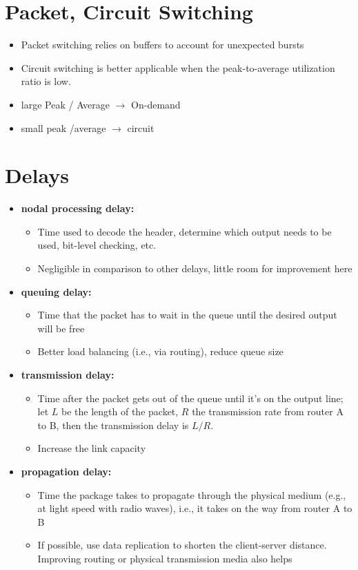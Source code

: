 \documentclass{article}
\begin{document}
\section{Packet, Circuit Switching}

\begin{itemize}
    \item Packet switching relies on buffers to account for unexpected bursts
    \item Circuit switching is better applicable when the peak-to-average utilization ratio is low.
    \item large Peak / Average $\rightarrow$ On-demand
    \item small peak /average $\rightarrow$ circuit
\end{itemize}

\section{Delays}

\begin{itemize}
    \item \textbf{nodal processing delay:}
    \begin{itemize}
        \item Time used to decode the header, determine which output needs to be used, bit-level checking, etc.
        \item Negligible in comparison to other delays, little room for improvement here
    \end{itemize}
    \item \textbf{queuing delay:}
    \begin{itemize}
        \item Time that the packet has to wait in the queue until the desired output will be free
        \item Better load balancing (i.e., via routing), reduce queue size
    \end{itemize}
    \item \textbf{transmission delay:}
    \begin{itemize}
        \item Time after the packet gets out of the queue until it's on the output line; let $L$ be the length of the packet, $R$ the transmission rate from router A to B, then the transmission delay is $L/R$.
        \item Increase the link capacity
    \end{itemize}
    \item \textbf{propagation delay:}
    \begin{itemize}
        \item Time the package takes to propagate through the physical medium (e.g., at light speed with radio waves), i.e., it takes on the way from router A to B
        \item If possible, use data replication to shorten the client-server distance. Improving routing or physical transmission media also helps
    \end{itemize}
\end{itemize}
\end{document}
